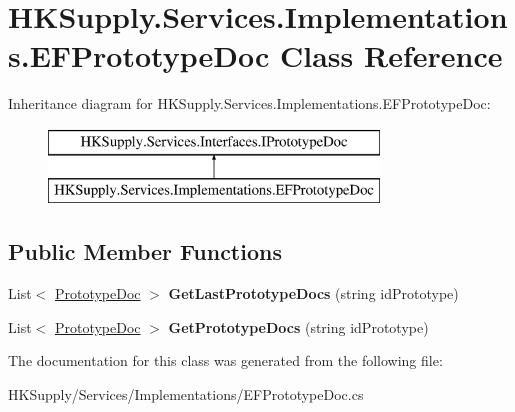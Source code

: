 \hypertarget{class_h_k_supply_1_1_services_1_1_implementations_1_1_e_f_prototype_doc}{}\section{H\+K\+Supply.\+Services.\+Implementations.\+E\+F\+Prototype\+Doc Class Reference}
\label{class_h_k_supply_1_1_services_1_1_implementations_1_1_e_f_prototype_doc}
Inheritance diagram for H\+K\+Supply.\+Services.\+Implementations.\+E\+F\+Prototype\+Doc\+:\begin{figure}[H]
\begin{center}
\leavevmode
\includegraphics[height=2.000000cm]{class_h_k_supply_1_1_services_1_1_implementations_1_1_e_f_prototype_doc}
\end{center}
\end{figure}
\subsection*{Public Member Functions}
\begin{DoxyCompactItemize}
\item 
\mbox{\label{class_h_k_supply_1_1_services_1_1_implementations_1_1_e_f_prototype_doc_a0cdbf8e7c1ba8057f474246762be7be6}} 
List$<$ \mbox{\hyperlink{class_h_k_supply_1_1_models_1_1_prototype_doc}{Prototype\+Doc}} $>$ {\bfseries Get\+Last\+Prototype\+Docs} (string id\+Prototype)
\item 
\mbox{\label{class_h_k_supply_1_1_services_1_1_implementations_1_1_e_f_prototype_doc_a501564c2eaa4b5960f64dddf07c25468}} 
List$<$ \mbox{\hyperlink{class_h_k_supply_1_1_models_1_1_prototype_doc}{Prototype\+Doc}} $>$ {\bfseries Get\+Prototype\+Docs} (string id\+Prototype)
\end{DoxyCompactItemize}


The documentation for this class was generated from the following file\+:\begin{DoxyCompactItemize}
\item 
H\+K\+Supply/\+Services/\+Implementations/E\+F\+Prototype\+Doc.\+cs\end{DoxyCompactItemize}
